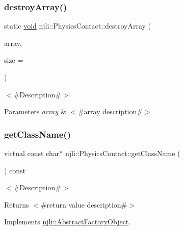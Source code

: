 \subsubsection{\texorpdfstring{destroy\+Array()}{destroyArray()}}
{\footnotesize\ttfamily static \mbox{\hyperlink{_thread_8h_af1e856da2e658414cb2456cb6f7ebc66}{void}} njli\+::\+Physics\+Contact\+::destroy\+Array (\begin{DoxyParamCaption}\item[{\mbox{\hyperlink{classnjli_1_1_physics_contact}{Physics\+Contact}} $\ast$$\ast$}]{array,  }\item[{const \mbox{\hyperlink{_util_8h_a10e94b422ef0c20dcdec20d31a1f5049}{u32}}}]{size = {} }\end{DoxyParamCaption})\hspace{0.3cm}{\ttfamily [static]}}

$<$\#\+Description\#$>$


\begin{DoxyParams}{Parameters}
{\em array} & $<$\#array description\#$>$ \\
\hline
\end{DoxyParams}
\mbox{\label{classnjli_1_1_physics_contact_a3b1f29b9f7dde712abecb0729290ee50}} 
\subsubsection{\texorpdfstring{get\+Class\+Name()}{getClassName()}}
{\footnotesize\ttfamily virtual const char$\ast$ njli\+::\+Physics\+Contact\+::get\+Class\+Name (\begin{DoxyParamCaption}{ }\end{DoxyParamCaption}) const\hspace{0.3cm}{\ttfamily [virtual]}}

$<$\#\+Description\#$>$

\begin{DoxyReturn}{Returns}
$<$\#return value description\#$>$ 
\end{DoxyReturn}


Implements \mbox{\hyperlink{classnjli_1_1_abstract_factory_object_af4151e41b80d5bc3fc42822c67fc2278}{njli\+::\+Abstract\+Factory\+Object}}.

\mbox{\label{classnjli_1_1_physics_contact_ad41266885be835f3ee602311e20877a4}} 
